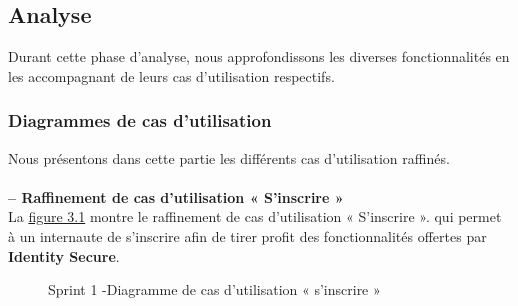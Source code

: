 \subsection{Analyse}

Durant cette phase d'analyse, nous approfondissons les diverses fonctionnalités en les accompagnant de leurs cas d'utilisation respectifs.
\subsubsection{Diagrammes de cas d'utilisation}
Nous présentons dans cette partie les différents cas d'utilisation raffinés.\\
\\
\textbf{ – Raffinement de cas d'utilisation « S'inscrire »}\\
La \hyperref[fig:3.1]{figure 3.1} montre le raffinement de cas d'utilisation « S'inscrire ».  qui permet à un internaute de s'inscrire afin de tirer profit des fonctionnalités offertes par \textbf{Identity Secure}.
\begin{figure}[H]
\centering
{}
\caption{ Sprint 1 -Diagramme de cas d'utilisation « s'inscrire »}
\label{fig:3.1}
\end{figure}

